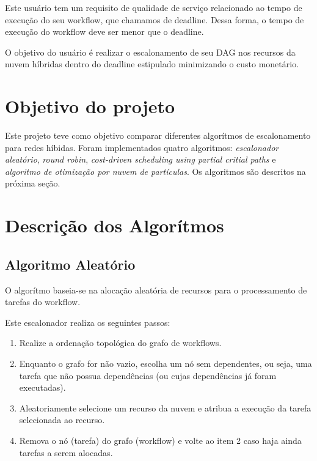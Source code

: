 \documentclass[a4paper,10pt]{article}
\begin{document}
Este usuário tem um requisito de qualidade de serviço relacionado 
ao tempo de execução do seu workflow, que chamamos de deadline. Dessa forma, o tempo 
de execução do workflow deve ser menor que o deadline.

O objetivo do usuário é realizar o escalonamento de seu DAG nos recursos da 
nuvem híbridas dentro do deadline estipulado minimizando o custo monetário.

\section{Objetivo do projeto}

Este projeto teve como objetivo comparar diferentes algorítmos de escalonamento 
para redes híbidas. Foram implementados quatro algoritmos: \emph{escalonador aleatório}, \emph{round robin},
\emph{cost-driven scheduling using partial critial paths} e \emph{algoritmo de otimização por nuvem de partículas}.
Os algoritmos são descritos na próxima seção.

\section{Descrição dos Algorítmos}
\label{algoritmos}

\subsection{Algoritmo Aleatório}

O algorítmo baseia-se na alocação aleatória de recursos para o processamento de tarefas do workflow.

Este escalonador realiza os seguintes passos:

\begin{enumerate}

    \item Realize a ordenação topológica do grafo de workflows.

    \item Enquanto o grafo for não vazio, escolha um nó sem dependentes, ou seja, uma tarefa que não possua dependências 
(ou cujas dependências já foram executadas).

    \item Aleatoriamente selecione um recurso da nuvem e atribua a execução da tarefa selecionada ao recurso.

    \item Remova o nó (tarefa) do grafo (workflow) e volte ao item 2 caso haja ainda tarefas a serem alocadas.

\end{enumerate}
\end{document}
